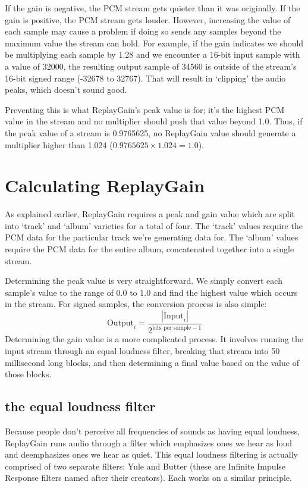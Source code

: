 If the gain is negative, the PCM stream gets quieter than it was
originally.
If the gain is positive, the PCM stream gets louder.
However, increasing the value of each sample may cause a problem
if doing so sends any samples beyond the maximum value the stream
can hold.
For example, if the gain indicates we should be multiplying each sample
by 1.28 and we encounter a 16-bit input sample with a value of 32000,
the resulting output sample of 34560 is outside of the stream's
16-bit signed range (-32678 to 32767).
That will result in `clipping' the audio peaks, which doesn't sound good.

Preventing this is what ReplayGain's peak value is for;
it's the highest PCM value in the stream and no multiplier should push
that value beyond 1.0.
Thus, if the peak value of a stream is 0.9765625, no ReplayGain value
should generate a multiplier higher than 1.024
($0.9765625 \times 1.024 = 1.0$).

\section{Calculating ReplayGain}

As explained earlier, ReplayGain requires a peak and gain value
which are split into `track' and `album' varieties for a total of four.
The `track' values require the PCM data for the particular track
we're generating data for.
The `album' values require the PCM data for the entire album,
concatenated together into a single stream.

Determining the peak value is very straightforward.
We simply convert each sample's value to the range of 0.0 to 1.0
and find the highest value which occurs in the stream.
For signed samples, the conversion process is also simple:
\begin{equation}
\text{Output}_i = \frac{| \text{Input}_i |}{2 ^ {\text{bits per sample} - 1}}
\end{equation}
Determining the gain value is a more complicated process.
It involves running the input stream through an equal loudness filter,
breaking that stream into 50 millisecond long blocks, and then
determining a final value based on the value of those blocks.

\subsection{the equal loudness filter}
Because people don't perceive all frequencies of sounds as having
equal loudness, ReplayGain runs audio through a filter which
emphasizes ones we hear as loud and deemphasizes ones we hear as quiet.
This equal loudness filtering is actually comprised of two separate
filters: Yule and Butter (these are Infinite Impulse Response filters
named after their creators).
Each works on a similar principle.


